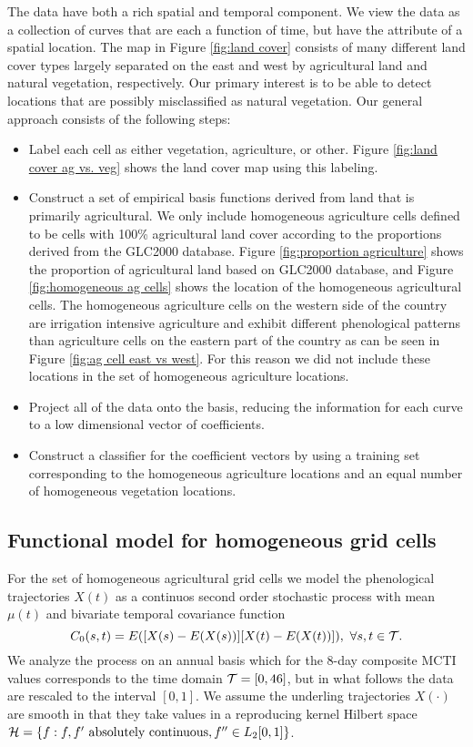 The data have both a rich spatial and temporal component. We view the data as a collection of curves that are each a function of time, but have the attribute of a spatial location. The map in Figure \ref{fig:land cover} consists of many different land cover types largely separated on the east and west by agricultural land and natural vegetation, respectively. Our primary interest is to be able to detect locations that are possibly misclassified as natural vegetation. Our general approach consists of the following steps:
\begin{itemize}
	\item Label each cell as either vegetation, agriculture, or other. Figure \ref{fig:land cover ag vs. veg} shows the land cover map using this labeling.
	\item Construct a set of empirical basis functions derived from land that is primarily agricultural. We only include homogeneous agriculture cells defined to be cells with 100\% agricultural land cover according to the proportions derived from the GLC2000 database. Figure \ref{fig:proportion agriculture} shows the proportion of agricultural land based on GLC2000 database, and Figure \ref{fig:homogeneous ag cells} shows the location of the homogeneous agricultural cells. The homogeneous agriculture cells on the western side of the country are irrigation intensive agriculture and exhibit different phenological patterns than agriculture cells on the eastern part of the country as can be seen in Figure \ref{fig:ag cell east vs west}. For this reason we did not include these locations in the set of homogeneous agriculture locations. 
	\item Project all of the data onto the basis, reducing the information for each curve to a low dimensional vector of coefficients.
	\item Construct a classifier for the coefficient vectors by using a training set corresponding to the homogeneous agriculture locations and an equal number of homogeneous vegetation locations.  
\end{itemize}

\subsection{Functional model for homogeneous grid cells} %
\label{sub:subsection_name}

 For the set of homogeneous agricultural grid cells we model the phenological trajectories $X(t)$ as a continuos second order stochastic process with mean $\mu(t)$ and bivariate temporal covariance function
\[ C_{0}(s,t)=E([X(s)-E(X(s))][X(t)-E(X(t))]),\mbox{ }\forall s,t\in \mathcal{T}. \]
We analyze the process on an annual basis which for the 8-day composite MCTI values corresponds to the time domain $\mathcal{T} = [0,46]$, but in what follows the data are rescaled to the interval $[0,1]$. We assume the underling trajectories $X(\cdot)$ are smooth in that they take values in a reproducing kernel Hilbert space $\mathcal{H}= \{f : f, f' \mbox{ absolutely continuous}, f'' \in L_2[0,1]\}$. 

